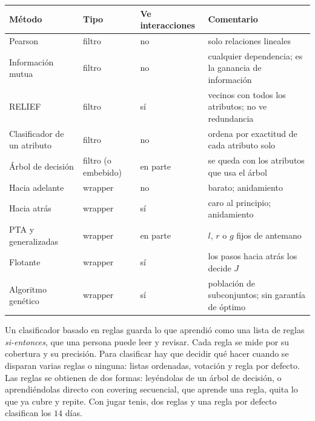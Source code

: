 \documentclass[11pt,letterpaper]{article}
\begin{document}
\begin{center}
\small
\begin{tabular}{>{\raggedright\arraybackslash}p{3.3cm}%
                l%
                >{\raggedright\arraybackslash}p{2.6cm}%
                >{\raggedright\arraybackslash}p{5.2cm}}
    \toprule
    \textbf{Método} & \textbf{Tipo} & \textbf{Ve interacciones}
        & \textbf{Comentario} \\
    \midrule
    Pearson & filtro & no & solo relaciones lineales \\
    \addlinespace
    Información mutua & filtro & no
        & cualquier dependencia; es la ganancia de información \\
    \addlinespace
    RELIEF & filtro & sí & vecinos con todos los atributos; no ve
        redundancia \\
    \addlinespace
    Clasificador de un atributo & filtro & no
        & ordena por exactitud de cada atributo solo \\
    \addlinespace
    Árbol de decisión & filtro (o embebido) & en parte
        & se queda con los atributos que usa el árbol \\
    \addlinespace
    Hacia adelante & wrapper & no & barato; anidamiento \\
    \addlinespace
    Hacia atrás & wrapper & sí & caro al principio; anidamiento \\
    \addlinespace
    PTA y generalizadas & wrapper & en parte
        & $l$, $r$ o $g$ fijos de antemano \\
    \addlinespace
    Flotante & wrapper & sí & los pasos hacia atrás los decide $J$ \\
    \addlinespace
    Algoritmo genético & wrapper & sí
        & población de subconjuntos; sin garantía de óptimo \\
    \bottomrule
\end{tabular}
\end{center}


\newpage



\begin{quick_sum}
    Un clasificador basado en reglas guarda lo que aprendió como una
    lista de reglas \textit{si-entonces}, que una persona puede leer y
    revisar. Cada regla se mide por su cobertura y su precisión. Para
    clasificar hay que decidir qué hacer cuando se disparan varias
    reglas o ninguna: listas ordenadas, votación y regla por defecto.
    Las reglas se obtienen de dos formas: leyéndolas de un árbol de
    decisión, o aprendiéndolas directo con covering secuencial, que
    aprende una regla, quita lo que ya cubre y repite. Con jugar tenis,
    dos reglas y una regla por defecto clasifican los $14$ días.
\end{quick_sum}
\end{document}
